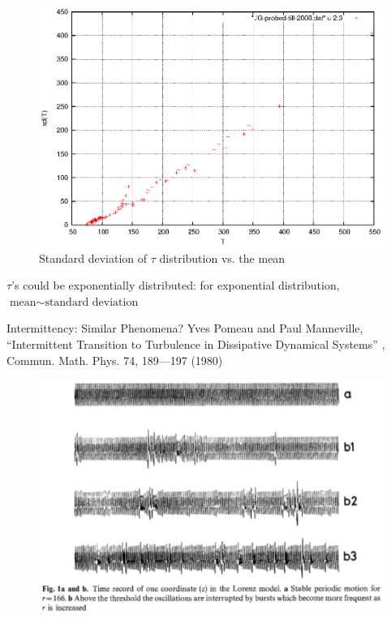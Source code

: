 \documentclass[xcolor=x11names,compress]{beamer}
\renewcommand{\(}{\begin{columns}}
\renewcommand{\)}{\end{columns}}
\newcommand{\<}[1]{\begin{column}{#1}}
\renewcommand{\>}{\end{column}}
\begin{document}
\begin{frame}

\begin{figure}
\caption{Standard deviation of $\tau$ distribution vs.  the mean}
\begin{center}
\includegraphics[width=0.7\columnwidth]{plot-sd-G-probe}
\end{center}
\end{figure}

$\tau$'s could be exponentially distributed: for exponential distribution, 
$\text{mean}\sim \text{standard deviation}$

\end{frame}


\begin{frame}{Intermittency: Similar Phenomena?}
Yves Pomeau and Paul Manneville, 
``Intermittent Transition to Turbulence
in Dissipative Dynamical Systems'' ,
Commun.   Math.   Phys.   74, 189---197 (1980)

\begin{figure}
\begin{center}
\includegraphics[width=0.7\columnwidth]{intermit-lorenz}
\end{center}
\end{figure}

\end{frame}
\end{document}
